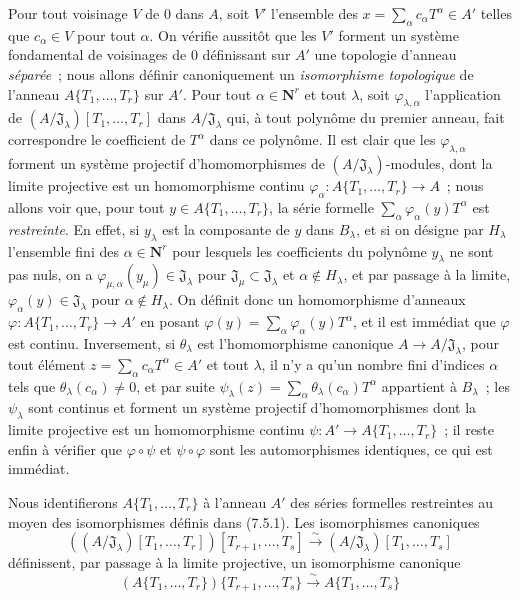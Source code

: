 \begin{env}[7.5.1]
Pour tout voisinage $V$ de $0$ dans $A$, soit $V'$ l'ensemble des
$x=\sum_\alpha c_\alpha T^\alpha\in A'$ telles que $c_\alpha\in V$ pour tout
$\alpha$. On vérifie aussitôt que les $V'$ forment un système fondamental de
voisinages de $0$ définissant sur $A'$ une topologie d'anneau \emph{séparée}~;
nous allons définir canoniquement un \emph{isomorphisme topologique} de
l'anneau $A\{T_1,\ldots,T_r\}$ sur $A'$. Pour tout
$\alpha\in\mathbf{N}^r$ et tout $\lambda$, soit
$\varphi_{\lambda,\alpha}$ l'application de
$(A/\mathfrak J_\lambda)[T_1,\ldots,T_r]$ dans
$A/\mathfrak J_\lambda$ qui, à tout polynôme du premier anneau, fait
correspondre le coefficient de $T^\alpha$ dans ce polynôme. Il est clair que
les $\varphi_{\lambda,\alpha}$ forment un système projectif d'homomorphismes
de $(A/\mathfrak J_\lambda)$-modules, dont la limite projective est un
homomorphisme continu
$\varphi_\alpha:A\{T_1,\ldots,T_r\}\to A$~; nous allons voir que, pour tout
$y\in A\{T_1,\ldots,T_r\}$, la série formelle
$\sum_\alpha\varphi_\alpha(y)T^\alpha$ est \emph{restreinte}. En effet, si
$y_\lambda$ est la composante de $y$ dans $B_\lambda$, et si on désigne par
$H_\lambda$ l'ensemble fini des $\alpha\in\mathbf{N}^r$ pour lesquels les
coefficients du polynôme $y_\lambda$ ne sont pas nuls, on a
$\varphi_{\mu,\alpha}(y_\mu)\in\mathfrak J_\lambda$ pour
$\mathfrak J_\mu\subset\mathfrak J_\lambda$ et $\alpha\notin H_\lambda$, et
par passage à la limite, $\varphi_\alpha(y)\in\mathfrak J_\lambda$ pour
$\alpha\notin H_\lambda$. On définit donc un homomorphisme d'anneaux
$\varphi:A\{T_1,\ldots,T_r\}\to A'$ en posant
$\varphi(y)=\sum_\alpha\varphi_\alpha(y)T^\alpha$, et il est immédiat que
$\varphi$ est continu. Inversement, si $\theta_\lambda$ est l'homomorphisme
canonique $A\to A/\mathfrak J_\lambda$, pour tout élément
$z=\sum_\alpha c_\alpha T^\alpha\in A'$ et tout $\lambda$, il n'y a qu'un
nombre fini d'indices $\alpha$ tels que $\theta_\lambda(c_\alpha)\neq0$, et
par suite
$\psi_\lambda(z)=\sum_\alpha\theta_\lambda(c_\alpha)T^\alpha$ appartient à
$B_\lambda$~; les $\psi_\lambda$ sont continus et forment un système
projectif d'homomorphismes dont la limite projective est un homomorphisme
continu $\psi:A'\to A\{T_1,\ldots,T_r\}$~; il reste enfin à vérifier que
$\varphi\circ\psi$ et $\psi\circ\varphi$ sont les automorphismes identiques,
ce qui est immédiat.
\end{env}

\begin{env}[7.5.2]
\label{0.7.5.2-fr}
Nous identifierons $A\{T_1,\ldots,T_r\}$ à l'anneau $A'$ des séries formelles
restreintes au moyen des isomorphismes définis dans (7.5.1). Les isomorphismes
canoniques
\[
  ((A/\mathfrak J_\lambda)[T_1,\ldots,T_r])
  [T_{r+1},\ldots,T_s]
  \xrightarrow{\sim}
  (A/\mathfrak J_\lambda)[T_1,\ldots,T_s]
\]
définissent, par passage à la limite projective, un isomorphisme canonique
\[
  (A\{T_1,\ldots,T_r\})\{T_{r+1},\ldots,T_s\}
  \xrightarrow{\sim}
  A\{T_1,\ldots,T_s\}
\]
\end{env}

